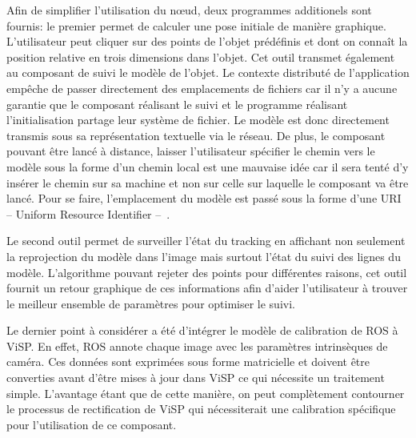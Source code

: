 Afin de simplifier l'utilisation du n\oe ud, deux programmes
additionels sont fournis: le premier permet de calculer une pose
initiale de manière graphique. L'utilisateur peut cliquer sur des
points de l'objet prédéfinis et dont on connaît la position relative
en trois dimensions dans l'objet. Cet outil transmet également au
composant de suivi le modèle de l'objet. Le contexte distributé de
l'application empêche de passer directement des emplacements de
fichiers car il n'y a aucune garantie que le composant réalisant le
suivi et le programme réalisant l'initialisation partage leur système
de fichier. Le modèle est donc directement transmis sous sa
représentation textuelle via le réseau. De plus, le composant pouvant
être lancé à distance, laisser l'utilisateur spécifier le chemin vers
le modèle sous la forme d'un chemin local est une mauvaise idée car il
sera tenté d'y insérer le chemin sur sa machine et non sur celle sur
laquelle le composant va être lancé. Pour se faire, l'emplacement du
modèle est passé sous la forme d'une URI -- Uniform Resource
Identifier --~\citep{rfc2396}.


Le second outil permet de surveiller l'état du tracking en affichant
non seulement la reprojection du modèle dans l'image mais surtout
l'état du suivi des lignes du modèle. L'algorithme pouvant rejeter des
points pour différentes raisons, cet outil fournit un retour graphique
de ces informations afin d'aider l'utilisateur à trouver le meilleur
ensemble de paramètres pour optimiser le suivi.


Le dernier point à considérer a été d'intégrer le modèle de
calibration de ROS à ViSP. En effet, ROS annote chaque image avec les
paramètres intrinsèques de caméra. Ces données sont exprimées sous
forme matricielle et doivent être converties avant d'être mises à jour
dans ViSP ce qui nécessite un traitement simple. L'avantage étant que
de cette manière, on peut complètement contourner le processus de
rectification de ViSP qui nécessiterait une calibration spécifique
pour l'utilisation de ce composant.


